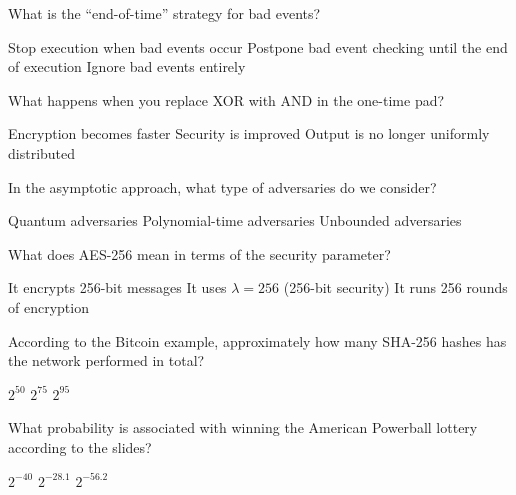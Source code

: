 \documentclass[10pt,a4paper,american]{exam}
\begin{document}
\begin{questions}
	\question What is the ``end-of-time'' strategy for bad events?
	\begin{randomizechoices}
		\choice Stop execution when bad events occur
		\CorrectChoice Postpone bad event checking until the end of execution
		\choice Ignore bad events entirely
	\end{randomizechoices}

	\question What happens when you replace XOR with AND in the one-time pad?
	\begin{randomizechoices}
		\choice Encryption becomes faster
		\choice Security is improved
		\CorrectChoice Output is no longer uniformly distributed
	\end{randomizechoices}

	\question In the asymptotic approach, what type of adversaries do we consider?
	\begin{randomizechoices}
		\choice Quantum adversaries
		\CorrectChoice Polynomial-time adversaries
		\choice Unbounded adversaries
	\end{randomizechoices}

	\question What does AES-256 mean in terms of the security parameter?
	\begin{randomizechoices}
		\choice It encrypts 256-bit messages
		\CorrectChoice It uses $\lambda = 256$ (256-bit security)
		\choice It runs 256 rounds of encryption
	\end{randomizechoices}

	\question According to the Bitcoin example, approximately how many SHA-256 hashes has the network performed in total?
	\begin{randomizechoices}
		\choice $2^{50}$
		\choice $2^{75}$
		\CorrectChoice $2^{95}$
	\end{randomizechoices}

	\question What probability is associated with winning the American Powerball lottery according to the slides?
	\begin{randomizechoices}
		\choice $2^{-40}$
		\CorrectChoice $2^{-28.1}$
		\choice $2^{-56.2}$
	\end{randomizechoices}

\end{questions}

\clearpage

\end{document}
